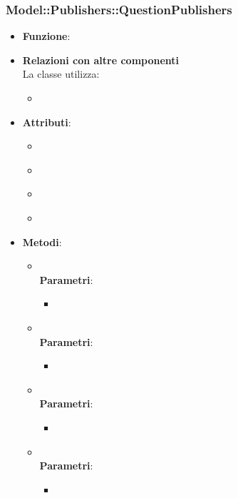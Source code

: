 \subsubsection{Model::Publishers::QuestionPublishers}
\begin{itemize}
\item\textbf{Funzione}:
\item\textbf{Relazioni con altre componenti}\\
La classe utilizza:
	\begin{itemize}
		\item
	\end{itemize}
\item\textbf{Attributi}:
	\begin{itemize}
		\item\code{}\\
		\item\code{}\\
		\item\code{}\\
		\item\code{}\\
	\end{itemize}
\item\textbf{Metodi}:
	\begin{itemize}
		\item\code{}\\
		\textbf{Parametri}:
			\begin{itemize}
				\item\code{}\\
			\end{itemize}
		\item\code{}\\
		\textbf{Parametri}:
			\begin{itemize}
				\item\code{}\\
			\end{itemize}
		\item\code{}\\
		\textbf{Parametri}:
			\begin{itemize}
				\item\code{}\\
			\end{itemize}
		\item\code{}\\
		\textbf{Parametri}:
			\begin{itemize}
				\item\code{}\\
			\end{itemize}
	\end{itemize}
\end{itemize}